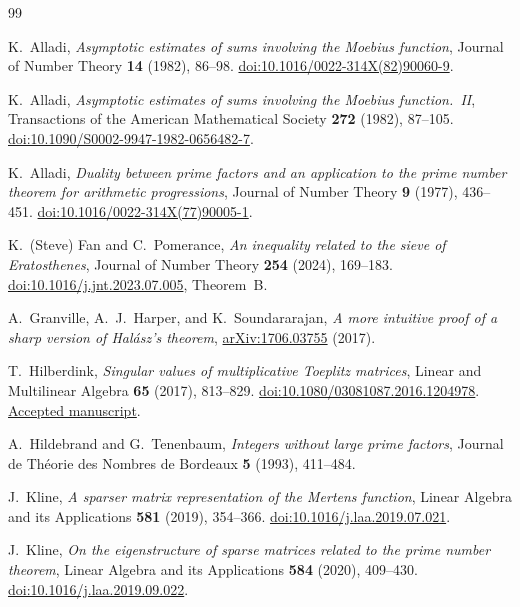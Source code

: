 \begin{thebibliography}{99}

K.~Alladi, \emph{Asymptotic estimates of sums involving the Moebius function},
Journal of Number Theory \textbf{14} (1982), 86--98.
\href{https://doi.org/10.1016/0022-314X(82)90060-9}{doi:10.1016/0022-314X(82)90060-9}.

K.~Alladi, \emph{Asymptotic estimates of sums involving the Moebius function.~II},
Transactions of the American Mathematical Society \textbf{272} (1982), 87--105.
\href{https://doi.org/10.1090/S0002-9947-1982-0656482-7}{doi:10.1090/S0002-9947-1982-0656482-7}.

K.~Alladi, \emph{Duality between prime factors and an application to the prime number theorem for arithmetic progressions},
Journal of Number Theory \textbf{9} (1977), 436--451.
\href{https://doi.org/10.1016/0022-314X(77)90005-1}{doi:10.1016/0022-314X(77)90005-1}.

K.~(Steve) Fan and C.~Pomerance, \emph{An inequality related to the sieve of Eratosthenes},
Journal of Number Theory \textbf{254} (2024), 169--183.
\href{https://doi.org/10.1016/j.jnt.2023.07.005}{doi:10.1016/j.jnt.2023.07.005}, Theorem~B.

A.~Granville, A.~J.~Harper, and K.~Soundararajan,
\emph{A more intuitive proof of a sharp version of Hal\'asz's theorem},
\href{https://arxiv.org/abs/1706.03755}{arXiv:1706.03755} (2017).

T.~Hilberdink, \emph{Singular values of multiplicative Toeplitz matrices},
Linear and Multilinear Algebra \textbf{65} (2017), 813--829.
\href{https://doi.org/10.1080/03081087.2016.1204978}{doi:10.1080/03081087.2016.1204978}.
\href{https://centaur.reading.ac.uk/66059/1/finitetoeplitz.pdf}{Accepted manuscript}.

A.~Hildebrand and G.~Tenenbaum, \emph{Integers without large prime factors},
Journal de Th\'eorie des Nombres de Bordeaux \textbf{5} (1993), 411--484.

J.~Kline, \emph{A sparser matrix representation of the Mertens function},
Linear Algebra and its Applications \textbf{581} (2019), 354--366.
\href{https://doi.org/10.1016/j.laa.2019.07.021}{doi:10.1016/j.laa.2019.07.021}.

J.~Kline, \emph{On the eigenstructure of sparse matrices related to the prime number theorem},
Linear Algebra and its Applications \textbf{584} (2020), 409--430.
\href{https://doi.org/10.1016/j.laa.2019.09.022}{doi:10.1016/j.laa.2019.09.022}.


\end{thebibliography}
